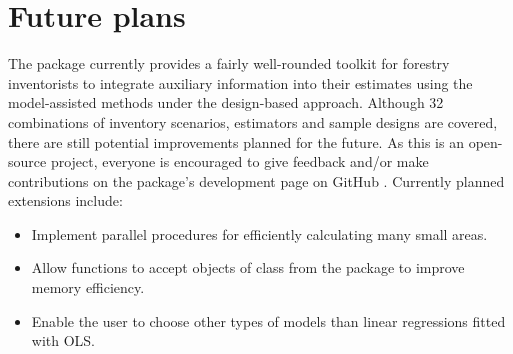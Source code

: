 \begin{figure}[h]
\centering
{}
\end{figure}



\section{Future plans}
\label{sec:future}

The  package currently provides a fairly well-rounded toolkit for forestry inventorists to integrate auxiliary information into their estimates using the model-assisted methods under the design-based approach.  Although 32 combinations of inventory scenarios, estimators and sample designs are covered, there are still potential improvements planned for the future. As this is an open-source project, everyone is encouraged to give feedback and/or make contributions on the package's development page on GitHub \citep{github_forestinventory}. Currently planned extensions include:

\begin{itemize}
\item Implement parallel procedures for efficiently calculating many small areas.
\item Allow functions to accept objects of class  from the  package \citep{dt2017} to improve memory efficiency.
\item Enable the user to choose other types of models than linear regressions fitted with OLS.
\end{itemize}

